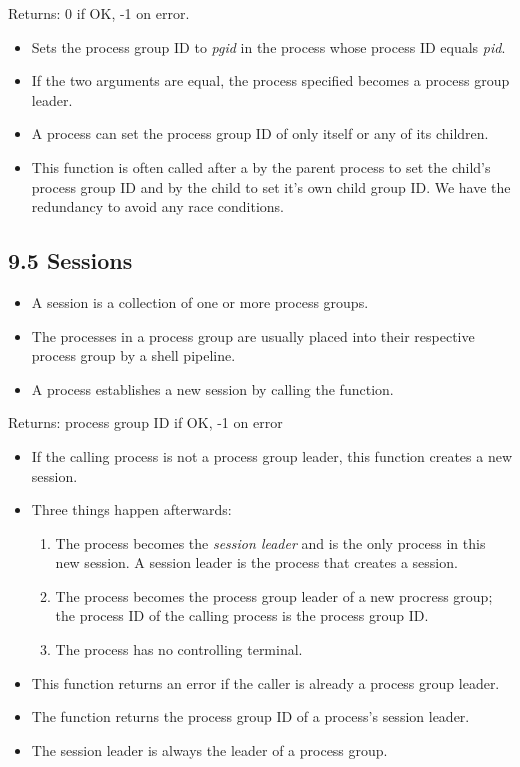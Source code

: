 \documentclass[]{article}
\begin{document}


Returns: 0 if OK, -1 on error.

\begin{itemize}
\item Sets the process group ID to \emph{pgid} in the process whose process ID
equals \emph{pid}.
\item If the two arguments are equal, the process specified becomes a process
group leader.
\item A process can set the process group ID of only itself or any of its
children.
\item This function is often called after a  by the parent process to
set the child's process group ID and by the child to set it's own child group
ID. We have the redundancy to avoid any race conditions.
\end{itemize}

\subsection*{9.5 Sessions}
\begin{itemize}
\item A session is a collection of one or more process groups.
\item The processes in a process group are usually placed into their respective
process group by a shell pipeline.
\item A process establishes a new session by calling the  function.
\end{itemize}



Returns: process group ID if OK, -1 on error

\begin{itemize}
\item If the calling process is not a process group leader, this function
creates a new session.
\item Three things happen afterwards:
\begin{enumerate}
\item The process becomes the \emph{session leader} and is the only process in
this new session. A session leader is the process that creates a session.
\item The process becomes the process group leader of a new procress group; the
process ID of the calling process is the process group ID.
\item The process has no controlling terminal.
\end{enumerate}
\item This function returns an error if the caller is already a process group
leader.
\item The  function returns the process group ID of a process's
session leader.
\item The session leader is always the leader of a process group.
\end{itemize}
\end{document}
